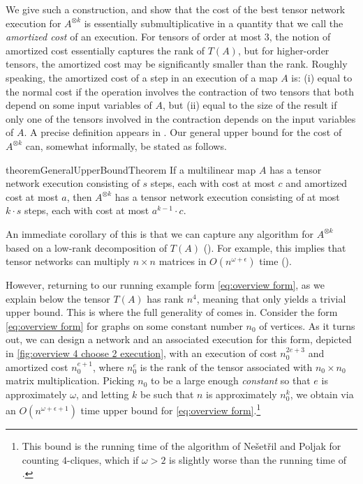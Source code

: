We give such a construction, and show that the cost of the best tensor
network execution for $A^{\otimes k}$ is essentially submultiplicative
in a quantity that we call the \emph{amortized cost} of an execution.
For tensors of order at most $3$, the notion of amortized cost
essentially captures the rank of $T(A)$, but for higher-order tensors,
the amortized cost may be significantly smaller than the rank.
Roughly speaking, the amortized cost of a step in an execution of a
map $A$ is: (i) equal to the normal cost if the operation involves the
contraction of two tensors that both depend on some input variables of
$A$, but (ii) equal to the size of the result if only one of the
tensors involved in the contraction depends on the input variables of
$A$.  A precise definition appears in .
Our general upper bound for the cost of $A^{\otimes k}$ can, somewhat
informally, be stated as follows.

\begin{restatable}{theorem}{GeneralUpperBoundTheorem}
  \label{thm:general upper bound}
  If a multilinear map $A$ has a tensor network execution
  consisting of $s$ steps, each with cost at most $c$ and amortized
  cost at most $a$, then $A^{\otimes k}$ has a tensor network
  execution consisting of at most $k \cdot s$ steps, each with cost at
  most $a^{k-1} \cdot c$.
\end{restatable}

An immediate corollary of this is that we can capture any algorithm
for $A^{\otimes k}$ based on a low-rank decomposition of $T(A)$
().  For example, this implies that
tensor networks can multiply $n \times n$ matrices in $O(n^{\omega +
  \epsilon})$ time ().

However, returning to our running example form \eqref{eq:overview
  form}, as we explain below the tensor $T(A)$ has rank $n^4$, meaning
that  only yields a trivial upper bound.
This is where the full generality of 
comes in.  Consider the form \eqref{eq:overview form} for graphs on
some constant number $n_0$ of vertices.  As it turns out, we can design
a network and an associated execution for this form, depicted
in \eqref{fig:overview 4 choose 2 execution},
with an execution of cost $n_0^{2e+3}$ and amortized cost
$n_0^{e+1}$, where $n_0^e$ is the rank of the tensor associated with
$n_0 \times n_0$ matrix multiplication.  Picking $n_0$ to be a large
enough \emph{constant} so that
$e$ is approximately $\omega$, and letting $k$ be such that $n$ is
approximately $n_0^k$, we obtain via  an
$O(n^{\omega +\epsilon + 1})$ time upper bound for \eqref{eq:overview form}.\footnote{This bound is the running time of the algorithm of Ne{\v{s}}et{\v{r}}il
and Poljak \cite{Nesetril1985} for counting $4$-cliques, which if $\omega > 2$ is slightly worse than the running time of .}

